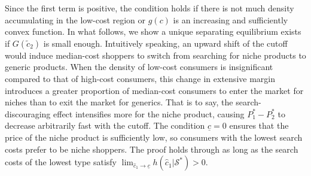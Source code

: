 \documentclass[14pt]{article}
\theoremstyle{plain}
\theoremstyle{definition}
\theoremstyle{remark}
\DeclareRobustCommand\1{\futurelet\oneNext\oneCheck}
\renewcommand{\S}{\mathcal{S}}
\begin{document}
Since the first term is positive, the condition holds if there is not much density accumulating in the low-cost region or $g(c)$ is an increasing and sufficiently convex function. In what follows, we show a unique separating equilibrium exists if $G(\tilde{c}_2)$ is small enough. Intuitively speaking, an upward shift of the cutoff would induce median-cost shoppers to switch from searching for niche products to generic products. When the density of low-cost consumers is insignificant compared to that of high-cost consumers, this change in extensive margin introduces a greater proportion of median-cost consumers to enter the market for niches than to exit the market for generics. That is to say, the search-discouraging effect intensifies more for the niche product, causing $P_1^*-P_2^*$ to decrease arbitrarily fast with the cutoff. The condition $\underline{c}=0$ ensures that the price of the niche product is sufficiently low, so consumers with the lowest search costs prefer to be niche shoppers. The proof holds through as long as the search costs of the lowest type satisfy
$\lim_{\hat{c}_1\to\underline{c}}h(\hat{c}_1|\S^*)>0$.
\end{document}

